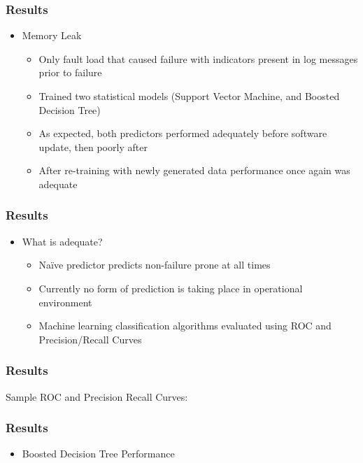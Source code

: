 \documentclass[aspectratio=169]{beamer}
\begin{document}
\begin{frame}
  \frametitle{Results}
  \begin{itemize}
  \item{Memory Leak}
    \begin{itemize}
    \item{Only fault load that caused failure with indicators present in log
    messages prior to failure}
    \item{Trained two statistical models (Support Vector Machine, and Boosted
    Decision Tree)}
    \item{As expected, both predictors performed adequately before software
    update, then poorly after}
    \item{After re-training with newly generated data performance once again
    was adequate}
    \end{itemize}
  \end{itemize}
\end{frame}


\begin{frame}
  \frametitle{Results}
  \begin{itemize}
  \item{What is adequate?}
    \begin{itemize}
    \item{Na{\"i}ve predictor predicts non-failure prone at all times}
    \item{Currently no form of prediction is taking place in operational
    environment}
    \item{Machine learning classification algorithms evaluated using ROC and
    Precision/Recall Curves~\cite{salfnerSurvey,islr}}
    \end{itemize}
  \end{itemize}
\end{frame}


\begin{frame}
  \frametitle{Results}
  Sample ROC and Precision Recall Curves:
  \begin{multicols}{2}
  \end{multicols}
\end{frame}


\begin{frame}
  \frametitle{Results}
  \begin{itemize}
  \item{Boosted Decision Tree Performance}
  \end{itemize}
  \figMemLeakPostUpdateBoostingPerf
\end{frame}
\end{document}
